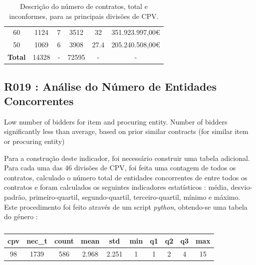 \begin{table}[H]
{\begin{tabular}{cccccc}
		60                   & 1124                                                                                & 7           & 3512                                                                          & 32          & 351.923.997,00€                                                           \\
		50                   & 1069                                                                                & 6           & 3908                                                                          & 27.4        & 205.240.508,00€                                                           \\ \midrule
		\textbf{Total}       & 14328                                                                               & -           & 72595                                                                         & -           & -                                                                         \\ \hline
	\end{tabular}%
	}
	\caption{Descrição do número de contratos, total e inconformes, para as principais divisões de CPV.}
	\label{tab:rf18stats}
\end{table}







\subsection{R019 : Análise do Número de Entidades Concorrentes}

	{
	Low number of bidders for item and procuring entity. Number of bidders significantly less than average, based on prior similar contracts (for similar item or procuring entity) 
	}


Para a construção deste indicador, foi necessário construir uma tabela adicional. Para cada uma das 46 divisões de CPV, foi feita uma contagem de todos os contratos, calculado o número total de entidades concorrentes de entre todos os contratos e foram calculados os seguintes indicadores estatísticos : média, desvio-padrão, primeiro-quartil, segundo-quartil, terceiro-quartil, mínimo e máximo. Este procedimento foi feito através de um script \textit{python}, obtendo-se uma tabela do género : 

\begin{table}[H]
	\centering
	\begin{tabular}{|c|c|c|c|c|c|c|c|c|c|}
		\hline
		\textbf{cpv} & \textbf{nec\_t} & \textbf{count} & \textbf{mean} & \textbf{std} & \textbf{min} & \textbf{q1} & \textbf{q2} & \textbf{q3} & \textbf{max} \\ \hline
		98           & 1739            & 586            & 2.968         & 2.251        & 1            & 1           & 2           & 4           & 15           \\ \hline
	\end{tabular}
	\caption{}
\end{table}

